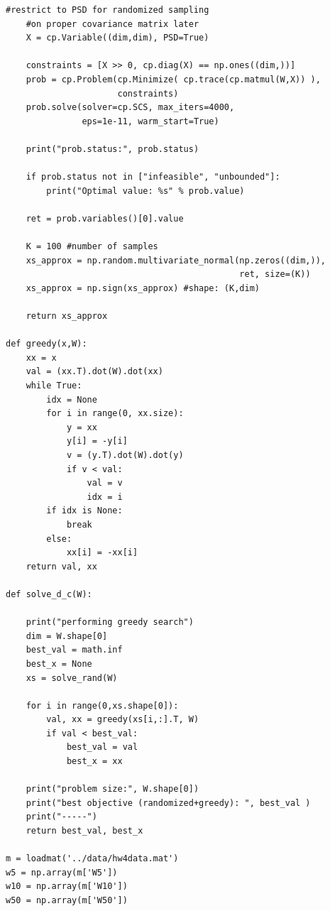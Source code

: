 \documentclass[12pt,letter]{article}
\begin{document}
\begin{enumerate}
\begin{enumerate}
\begin{itemize}
\begin{Verbatim}[fontsize=\small]
    #restrict to PSD for randomized sampling
    #on proper covariance matrix later
    X = cp.Variable((dim,dim), PSD=True)
    
    constraints = [X >> 0, cp.diag(X) == np.ones((dim,))]
    prob = cp.Problem(cp.Minimize( cp.trace(cp.matmul(W,X)) ),
                      constraints)
    prob.solve(solver=cp.SCS, max_iters=4000,
               eps=1e-11, warm_start=True)

    print("prob.status:", prob.status)
    
    if prob.status not in ["infeasible", "unbounded"]:
        print("Optimal value: %s" % prob.value)
    
    ret = prob.variables()[0].value

    K = 100 #number of samples
    xs_approx = np.random.multivariate_normal(np.zeros((dim,)),
                                              ret, size=(K))
    xs_approx = np.sign(xs_approx) #shape: (K,dim)

    return xs_approx
    
def greedy(x,W):
    xx = x
    val = (xx.T).dot(W).dot(xx)
    while True:
        idx = None
        for i in range(0, xx.size):
            y = xx
            y[i] = -y[i]
            v = (y.T).dot(W).dot(y)
            if v < val:
                val = v
                idx = i
        if idx is None:
            break
        else:
            xx[i] = -xx[i]
    return val, xx

def solve_d_c(W):
    
    print("performing greedy search")
    dim = W.shape[0]
    best_val = math.inf
    best_x = None
    xs = solve_rand(W)
    
    for i in range(0,xs.shape[0]):
        val, xx = greedy(xs[i,:].T, W)
        if val < best_val:
            best_val = val
            best_x = xx
            
    print("problem size:", W.shape[0])
    print("best objective (randomized+greedy): ", best_val )
    print("-----")
    return best_val, best_x

m = loadmat('../data/hw4data.mat')
w5 = np.array(m['W5'])
w10 = np.array(m['W10'])
w50 = np.array(m['W50'])


\end{Verbatim}
\end{itemize}
\end{enumerate}
\end{enumerate}
\end{document}
